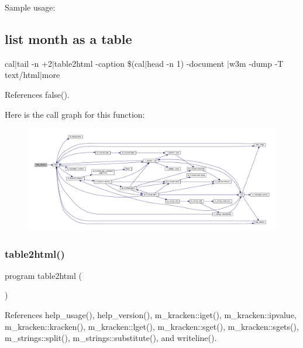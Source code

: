 Sample usage\+:

\subsection*{list month as a table}

cal$\vert$tail -\/n +2$\vert$table2html -\/caption \$(cal$\vert$head -\/n 1) -\/document $\vert$w3m -\/dump -\/T text/html$\vert$more 

References false().

Here is the call graph for this function\+:
\nopagebreak
\begin{figure}[H]
\begin{center}
\leavevmode
\includegraphics[width=350pt]{table2html_8f90_a39c21619b08a3c22f19e2306efd7f766_cgraph}
\end{center}
\end{figure}
\mbox{\label{table2html_8f90_ac9fa6313f884ee5cf8caf9b9bfb9f3cd}} 
\subsubsection{\texorpdfstring{table2html()}{table2html()}}
{\footnotesize\ttfamily program table2html (\begin{DoxyParamCaption}{ }\end{DoxyParamCaption})}



References help\+\_\+usage(), help\+\_\+version(), m\+\_\+kracken\+::iget(), m\+\_\+kracken\+::ipvalue, m\+\_\+kracken\+::kracken(), m\+\_\+kracken\+::lget(), m\+\_\+kracken\+::sget(), m\+\_\+kracken\+::sgets(), m\+\_\+strings\+::split(), m\+\_\+strings\+::substitute(), and writeline().

